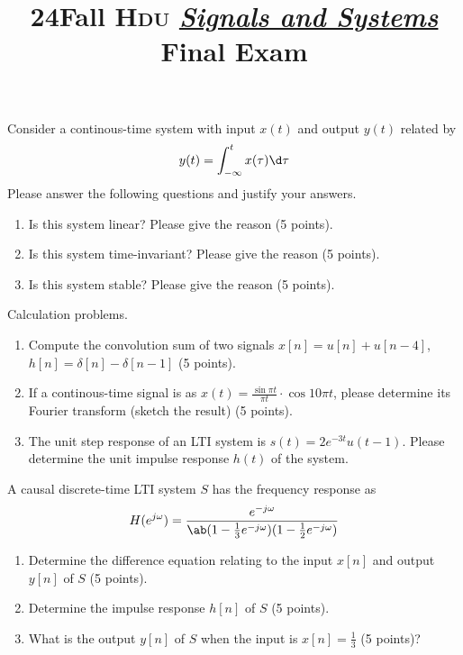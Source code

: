 \documentclass{article}
\title{\bfseries
  24Fall \textsc{Hdu}
  \emph{\sffamily \underline{Signals and Systems}} Final Exam
}
\author{} \date{}
\begin{document}
\maketitle

\begin{problem}[15 pt]
  Consider a continous-time system with input $x(t)$ and output $y(t)$
  related by
  \[y(t) = \int_{-\infty}^t x(\tau) \d\tau\]
  Please answer the following questions and justify your answers.
  \begin{enumerate}
    \item Is this system linear? Please give the reason (5 points).
    \item Is this system time-invariant? Please give the reason (5 points).
    \item Is this system stable? Please give the reason (5 points).
  \end{enumerate}
\end{problem}
\begin{solution}

\end{solution}

\begin{problem}[15 pt]
  Calculation problems.
  \begin{enumerate}
    \item Compute the convolution sum of two signals $x[n] = u[n] + u[n - 4]$,
    $h[n] = \delta[n] - \delta[n - 1]$ (5 points).
    \item If a continous-time signal is as
    $x(t) = \frac{\sin \pi t}{\pi t} \cdot \cos 10\pi t$,
    please determine its Fourier transform (sketch the result) (5 points).
    \item The unit step response of an LTI system is $s(t) = 2e^{-3t} u(t - 1)$.
    Please determine the unit impulse response $h(t)$ of the system.
  \end{enumerate}
\end{problem}
\begin{solution}

\end{solution}

\begin{problem}[15 pt]
  A causal discrete-time LTI system $S$ has the frequency response as
  \[
    H(e^{j\omega}) =
    \frac{e^{-j\omega}}{\ab(1 - \frac13 e^{-j\omega})(1 - \frac12 e^{-j\omega})}
  \]
  \begin{enumerate}
    \item Determine the difference equation relating to the input $x[n]$
    and output $y[n]$ of $S$ (5 points).
    \item Determine the impulse response $h[n]$ of $S$ (5 points).
    \item What is the output $y[n]$ of $S$ when the input is $x[n] = \frac13$ (5 points)?
  \end{enumerate}
\end{problem}
\begin{solution}

\end{solution}
\end{document}
